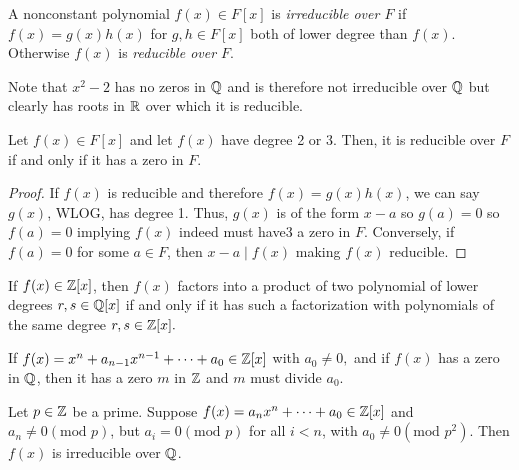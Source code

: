 \begin{definition}
    A nonconstant polynomial $f(x) \in F[x]$ is \emph{irreducible over $F$} if $f(x) = g(x)h(x)$ for $g, h \in F[x]$ both of lower degree than $f(x)$. Otherwise $f(x)$ is \emph{reducible over $F$}.
\end{definition}
\begin{example}
    Note that $x^2-2$ has no zeros in $\mathbb{Q}$ and is therefore not irreducible over $\mathbb{Q}$ but clearly has roots in $\mathbb{R}$ over which it is reducible.
\end{example}
\begin{theorem}
    Let $f(x) \in F[x]$ and let $f(x)$ have degree 2 or 3. Then, it is reducible over $F$ if and only if it has a zero in $F$.
\end{theorem}
\begin{proof}
    If $f(x)$ is reducible and therefore $f(x) = g(x)h(x)$, we can say $g(x)$, WLOG, has degree 1. Thus, $g(x)$ is of the form $x-a$ so $g(a) = 0$ so $f(a) = 0$ implying $f(x)$ indeed must have3 a zero in $F$. Conversely, if $f(a) = 0$ for some $a \in F$, then $x-a \mid f(x)$ making $f(x)$ reducible.
\end{proof}
\begin{theorem}
    If $f(x) \in \mathbb{Z}[x]$, then $f(x)$ factors into a product of two polynomial of lower degrees $r,s \in \mathbb{Q}[x]$ if and only if it has such a factorization with polynomials of the same degree $r,s \in \mathbb{Z}[x].$
\end{theorem}
\begin{corollary}
    If $f(x) = x^n + a_{n-1}x^{n-1}+\cdots+a_0 \in \mathbb{Z}[x]$ with $a_0 \neq 0,$ and if $f(x)$ has a zero in $\mathbb{Q}$, then it has a zero $m$ in $\mathbb{Z}$ and $m$ must divide $a_0.$
\end{corollary}
\begin{theorem}
    Let $p \in \mathbb{Z}$ be a prime. Suppose $f(x) = a_nx^n + \cdots + a_0 \in \mathbb{Z}[x]$ and $a_n \neq 0 (\text{mod } p)$, but $a_i = 0 (\text{mod } p)$ for all $i < n$, with $a_0 \neq 0 (\text{mod } p^2)$. Then $f(x)$ is irreducible over $\mathbb{Q}$.
\end{theorem}
